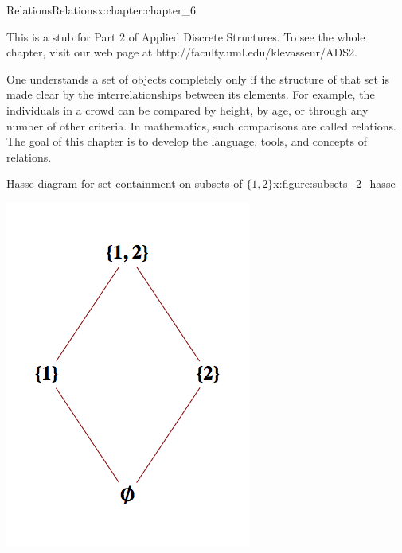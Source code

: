 \documentclass[oneside,10pt,]{book}
\numberwithin{equation}{section}
\begin{document}
\begin{chapterptx}{Relations}{}{Relations}{}{}{x:chapter:chapter_6}
\begin{introduction}{}%
This is a stub for Part 2 of Applied Discrete Structures. To see the whole chapter, visit our web page at http:\slash{}\slash{}faculty.uml.edu\slash{}klevasseur\slash{}ADS2.%
\par
One understands a set of objects completely only if the structure of that set is made clear by the interrelationships between its elements. For example, the individuals in a crowd can be compared by height, by age, or through any number of other criteria. In mathematics, such comparisons are called relations. The goal of this chapter is to develop the language, tools, and concepts of relations.%
\end{introduction}%
\begin{figureptx}{Hasse diagram for set containment on subsets of \(\{1,2\}\)}{x:figure:subsets_2_hasse}{}%
\begin{image}{0}{1}{0}%
\includegraphics[width=\linewidth]{images/subsets_2_hasse.png}

\end{image}
\end{figureptx}
\end{chapterptx}
\end{document}
